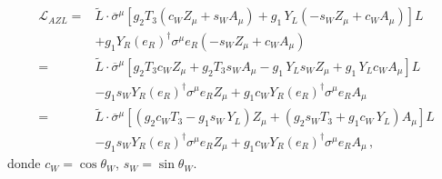 \begin{frame}
\begin{align}
\label{eq:brot}
  \mathcal{L}_{A Z L}=& \widetilde{L}\cdot\overline{\sigma}^\mu\left[g_2 T_3(c_W Z_\mu+s_W A_\mu)+{g_1}\,Y_L(-s_W Z_\mu+c_W A_\mu)\right]L \nonumber\\
    &+g_1 Y_R\left(e_R \right)^{\dagger}\sigma^\mu  {e_R} (-s_W Z_\mu+c_W A_\mu)\nonumber\\
     =& \widetilde{L}\cdot\overline{\sigma}^\mu\left[g_2 T_3c_W Z_\mu+g_2 T_3s_W A_\mu-{g_1}\,Y_Ls_W Z_\mu+{g_1}\,Y_Lc_W A_\mu\right]L\nonumber\\
&-g_1 s_W Y_R\left(e_R \right)^{\dagger}\sigma^\mu  {e_R}Z_{\mu}  +g_1 c_W Y_R\left(e_R \right)^{\dagger}\sigma^\mu  {e_R}A_{\mu}  \nonumber\\
    =& \widetilde{L}\cdot\overline{\sigma}^\mu\left[\left(g_2 c_WT_3-{g_1}s_W\,Y_L\right)Z_\mu
       +\left(g_2 s_W T_3+{g_1}c_W\,Y_L\right) A_\mu\right]L \nonumber\\
&-g_1 s_W Y_R\left(e_R \right)^{\dagger}\sigma^\mu  {e_R}Z_{\mu}  +g_1 c_W Y_R\left(e_R \right)^{\dagger}\sigma^\mu  {e_R}A_{\mu}  \,,
\end{align}
donde $c_W=\cos\theta_W$, $s_W=\sin\theta_W$. 


\end{frame}

